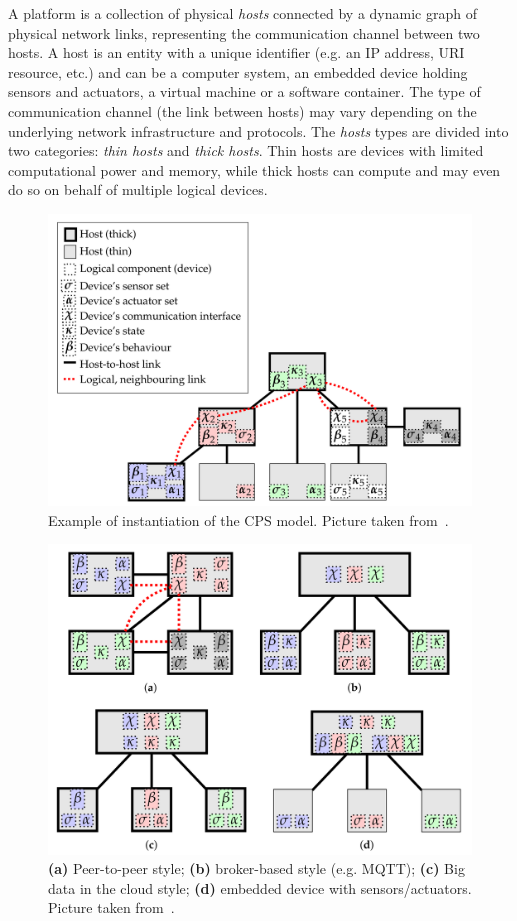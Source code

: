 A platform is a collection of physical \emph{hosts} connected by a dynamic graph of physical network links, representing the communication channel
between two hosts. A host is an entity with a unique identifier (e.g. an IP address, URI resource, etc.) and can be a computer system, an embedded
device holding sensors and actuators, a virtual machine or a software container. The type of communication channel (the link between hosts) may
vary depending on the underlying network infrastructure and protocols.
The \emph{hosts} types are divided into two categories: \emph{thin hosts} and \emph{thick hosts}. Thin hosts are devices with limited computational
power and memory, while thick hosts can compute and may even do so on behalf of multiple logical devices.

\begin{figure}[ht]
	\centering
	\includegraphics[width=0.7\linewidth]{figures/cps-example.png}
	\caption{Example of instantiation of the CPS model. Picture taken from~\cite{fi12110203}.}
	\label{fig:cps-example}
\end{figure}

\begin{figure}[ht]
	\centering
	\includegraphics[width=0.7\linewidth]{figures/notable-deployments.png}
	\caption{\textbf{(a)} Peer-to-peer style; \textbf{(b)} broker-based style (e.g. MQTT); \textbf{(c)} Big data in the cloud style; \textbf{(d)} embedded device with sensors/actuators. Picture taken from~\cite{fi12110203}.}
	\label{fig:notable-deployments}
\end{figure}

